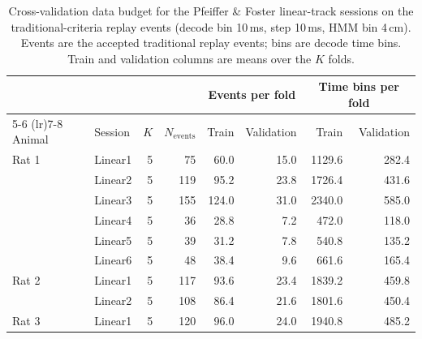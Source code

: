 \begin{table}[htbp]
  \centering
  \begin{tabular}{llrrrrrr}
    \toprule
    & & & & \multicolumn{2}{c}{Events per fold} & \multicolumn{2}{c}{Time bins per fold} \\
    \cmidrule(lr){5-6} \cmidrule(lr){7-8}
    Animal & Session & $K$ & $N_{\mathrm{events}}$ & Train & Validation & Train & Validation \\
    \midrule
    Rat 1 & Linear1 & 5 & 75 & 60.0 & 15.0 & 1129.6 & 282.4 \\
     & Linear2 & 5 & 119 & 95.2 & 23.8 & 1726.4 & 431.6 \\
     & Linear3 & 5 & 155 & 124.0 & 31.0 & 2340.0 & 585.0 \\
     & Linear4 & 5 & 36 & 28.8 & 7.2 & 472.0 & 118.0 \\
     & Linear5 & 5 & 39 & 31.2 & 7.8 & 540.8 & 135.2 \\
     & Linear6 & 5 & 48 & 38.4 & 9.6 & 661.6 & 165.4 \\
    \addlinespace
    Rat 2 & Linear1 & 5 & 117 & 93.6 & 23.4 & 1839.2 & 459.8 \\
     & Linear2 & 5 & 108 & 86.4 & 21.6 & 1801.6 & 450.4 \\
    \addlinespace
    Rat 3 & Linear1 & 5 & 120 & 96.0 & 24.0 & 1940.8 & 485.2 \\
    \bottomrule
  \end{tabular}
  \caption{Cross-validation data budget for the Pfeiffer \& Foster linear-track sessions on the traditional-criteria replay events (decode bin 10\,ms, step 10\,ms, HMM bin 4\,cm). Events are the accepted traditional replay events; bins are decode time bins. Train and validation columns are means over the $K$ folds.}
  \label{tab:cv-budget-pfeiffer-tradreplay}
\end{table}
